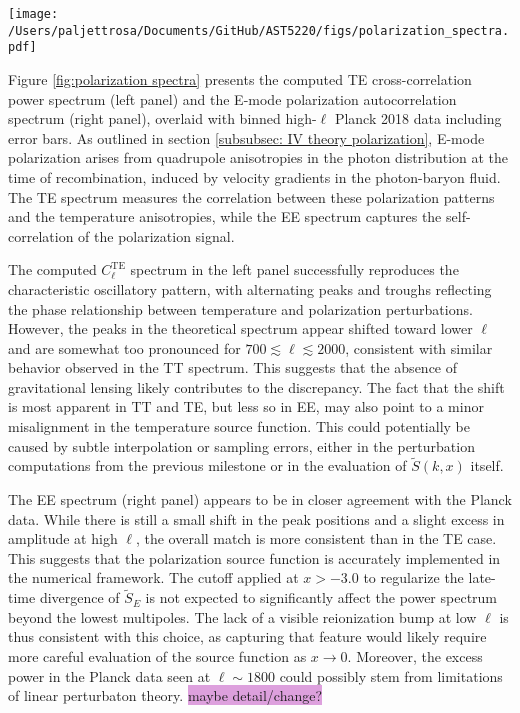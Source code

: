 \documentclass{aa}
\numberwithin{equation}{section}
\numberwithin{table}{section}
\numberwithin{figure}{section}
\begin{document}
\begin{figure*}
\centering
\texttt{[image: /Users/paljettrosa/Documents/GitHub/AST5220/figs/polarization\_spectra.pdf]}
\caption{The CMB TE (left) and EE (right) polarization spectra compared with binned high-$\ell$ Planck data. The computed spectra reproduce the oscillatory features observed in the data, although the TE spectrum shows a slight shift in peak locations and excess power for $\ell \gtrsim 700$, likely due to the absence of lensing and minor numerical discrepancies.}\label{fig:polarization spectra}
\end{figure*}

Figure \ref{fig:polarization spectra} presents the computed TE cross-correlation power spectrum (left panel) and the E-mode polarization autocorrelation spectrum (right panel), overlaid with binned high-$\ell$ Planck 2018 data including error bars. As outlined in section \ref{subsubsec: IV theory polarization}, E-mode polarization arises from quadrupole anisotropies in the photon distribution at the time of recombination, induced by velocity gradients in the photon-baryon fluid. The TE spectrum measures the correlation between these polarization patterns and the temperature anisotropies, while the EE spectrum captures the self-correlation of the polarization signal.

The computed $C_\ell^\text{TE}$ spectrum in the left panel successfully reproduces the characteristic oscillatory pattern, with alternating peaks and troughs reflecting the phase relationship between temperature and polarization perturbations. However, the peaks in the theoretical spectrum appear shifted toward lower $\ell$ and are somewhat too pronounced for $700 \lesssim \ell \lesssim 2000$, consistent with similar behavior observed in the TT spectrum. This suggests that the absence of gravitational lensing likely contributes to the discrepancy. The fact that the shift is most apparent in TT and TE, but less so in EE, may also point to a minor misalignment in the temperature source function. This could potentially be caused by subtle interpolation or sampling errors, either in the perturbation computations from the previous milestone or in the evaluation of $\tilde{S}(k,x)$ itself.

The EE spectrum (right panel) appears to be in closer agreement with the Planck data. While there is still a small shift in the peak positions and a slight excess in amplitude at high $\ell$, the overall match is more consistent than in the TE case. This suggests that the polarization source function is accurately implemented in the numerical framework. The cutoff applied at $x > -3.0$ to regularize the late-time divergence of $\tilde{S}_E$ is not expected to significantly affect the power spectrum beyond the lowest multipoles. The lack of a visible reionization bump at low $\ell$ is thus consistent with this choice, as capturing that feature would likely require more careful evaluation of the source function as $x\to0$. Moreover, the excess power in the Planck data seen at $\ell\sim1800$ could possibly stem from limitations of linear perturbaton theory. \colorbox{Plum}{maybe detail/change?}
\end{document}
